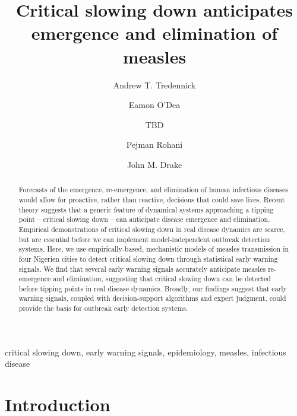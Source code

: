 \documentclass[3p]{elsarticle} %
\begin{document}
\begin{frontmatter}

  \title{Critical slowing down anticipates emergence and elimination of measles}
    \author[UGA,CEID]{Andrew T. Tredennick}
    \author[UGA,CEID]{Eamon O'Dea}
  
  
    \author[other]{TBD}
  
  
    \author[UGA,CEID,ID]{Pejman Rohani}
  
  
    \author[UGA,CEID]{John M. Drake}
  
      \address[UGA]{Odum School of Ecology, University of Georgia, Athens, GA 30602, USA}
    \address[CEID]{Center for the Ecology of Infectious Diseases, University of Georgia,
Athens, GA 30602, USA}
    \address[other]{A University of Somewhere}
    \address[ID]{Department of Infectious Diseases, University of Georgia, Athens, GA
30602, USA}
  
  \begin{abstract}
  Forecasts of the emergence, re-emergence, and elimination of human
  infectious diseases would allow for proactive, rather than reactive,
  decisions that could save lives. Recent theory suggests that a generic
  feature of dynamical systems approaching a tipping point -- critical
  slowing down -- can anticipate disease emergence and elimination.
  Empirical demonstrations of critical slowing down in real disease
  dynamics are scarce, but are essential before we can implement
  model-independent outbreak detection systems. Here, we use
  empirically-based, mechanistic models of measles transmission in four
  Nigerien cities to detect critical slowing down through statistical
  early warning signals. We find that several early warning signals
  accurately anticipate measles re-emergence and elimination, suggesting
  that critical slowing down can be detected before tipping points in real
  disease dynamics. Broadly, our findings suggest that early warning
  signals, coupled with decision-support algorithms and expert judgment,
  could provide the basis for outbreak early detection systems.
  \end{abstract}
   \begin{keyword} critical slowing down, early warning signals, epidemiology, measles, infectious disease\end{keyword}
 \end{frontmatter}

\section{Introduction}\label{introduction}
\end{document}
